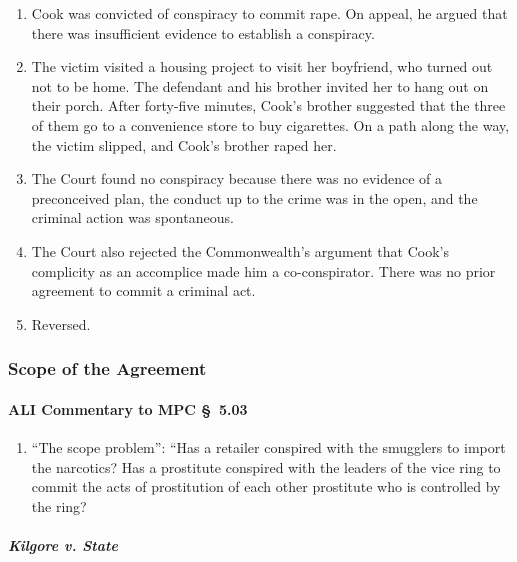 \begin{enumerate}
    \item Cook was convicted of conspiracy to commit rape. On appeal, he 
    argued that there was insufficient evidence to establish a conspiracy.
    \item The victim visited a housing project to visit her boyfriend, who 
    turned out not to be home. The defendant and his brother invited her to 
    hang out on their porch. After forty-five minutes, Cook's brother 
    suggested that the three of them go to a convenience store to buy 
    cigarettes. On a path along the way, the victim slipped, and Cook's 
    brother raped her.
    \item The Court found no conspiracy because there was no evidence of a 
    preconceived plan, the conduct up to the crime was in the open, and the 
    criminal action was spontaneous.
    \item The Court also rejected the Commonwealth's argument that Cook's 
    complicity as an accomplice made him a co-conspirator. There was no prior 
    agreement to commit a criminal act.
    \item Reversed.
\end{enumerate}

\subsubsection{Scope of the Agreement}

\paragraph{ALI Commentary to MPC \S\ 5.03}

\begin{enumerate}
    \item ``The scope problem'': ``Has a retailer conspired with the smugglers 
    to import the narcotics? Has a prostitute conspired with the leaders of 
    the vice ring to commit the acts of prostitution of each other prostitute 
    who is controlled by the ring?
\end{enumerate}

\paragraph{\emph{Kilgore v. State}}

